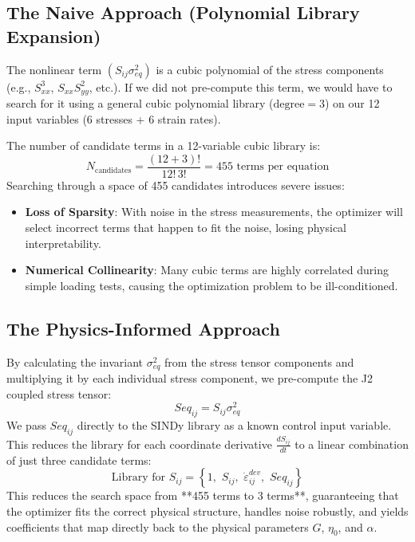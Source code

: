 \documentclass{article}
\begin{document}
\subsection{The Naive Approach (Polynomial Library Expansion)}
The nonlinear term $(S_{ij} \sigma_{eq}^2)$ is a cubic polynomial of the stress components (e.g., $S_{xx}^3$, $S_{xx}S_{yy}^2$, etc.). If we did not pre-compute this term, we would have to search for it using a general cubic polynomial library ($\text{degree} = 3$) on our 12 input variables (6 stresses + 6 strain rates). 

The number of candidate terms in a 12-variable cubic library is:
\begin{equation}
    N_{\text{candidates}} = \frac{(12 + 3)!}{12! \, 3!} = 455 \text{ terms per equation}
\end{equation}
Searching through a space of 455 candidates introduces severe issues:
\begin{itemize}
    \item \textbf{Loss of Sparsity}: With noise in the stress measurements, the optimizer will select incorrect terms that happen to fit the noise, losing physical interpretability.
    \item \textbf{Numerical Collinearity}: Many cubic terms are highly correlated during simple loading tests, causing the optimization problem to be ill-conditioned.
\end{itemize}

\subsection{The Physics-Informed Approach}
By calculating the invariant $\sigma_{eq}^2$ from the stress tensor components and multiplying it by each individual stress component, we pre-compute the J2 coupled stress tensor:
\begin{equation}
    Seq_{ij} = S_{ij} \sigma_{eq}^2
\end{equation}
We pass $Seq_{ij}$ directly to the SINDy library as a known control input variable. This reduces the library for each coordinate derivative $\frac{d S_{ij}}{dt}$ to a linear combination of just three candidate terms:
\begin{equation}
    \text{Library for } S_{ij} = \left\{ 1, \,\, S_{ij}, \,\, \dot{\varepsilon}^{dev}_{ij}, \,\, Seq_{ij} \right\}
\end{equation}
This reduces the search space from **455 terms to 3 terms**, guaranteeing that the optimizer fits the correct physical structure, handles noise robustly, and yields coefficients that map directly back to the physical parameters $G$, $\eta_0$, and $\alpha$.
\end{document}
